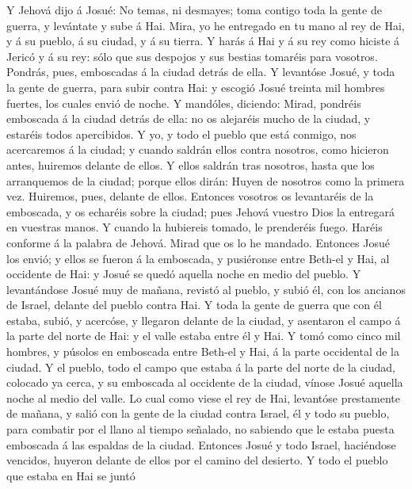  Y Jehová dijo á Josué: No temas, ni desmayes; toma
contigo toda la gente de guerra, y levántate y sube á Hai. Mira, yo he
entregado en tu mano al rey de Hai, y á su pueblo, á su ciudad, y á su
tierra.  Y harás á Hai y á su rey como hiciste á Jericó y
á su rey: sólo que sus despojos y sus bestias tomaréis para vosotros.
Pondrás, pues, emboscadas á la ciudad detrás de ella.  Y
levantóse Josué, y toda la gente de guerra, para subir contra Hai: y
escogió Josué treinta mil hombres fuertes, los cuales envió de noche.
 Y mandóles, diciendo: Mirad, pondréis emboscada á la
ciudad detrás de ella: no os alejaréis mucho de la ciudad, y estaréis
todos apercibidos.  Y yo, y todo el pueblo que está
conmigo, nos acercaremos á la ciudad; y cuando saldrán ellos contra
nosotros, como hicieron antes, huiremos delante de ellos. 
Y ellos saldrán tras nosotros, hasta que los arranquemos de la ciudad;
porque ellos dirán: Huyen de nosotros como la primera vez. Huiremos,
pues, delante de ellos.  Entonces vosotros os levantaréis
de la emboscada, y os echaréis sobre la ciudad; pues Jehová vuestro Dios
la entregará en vuestras manos.  Y cuando la hubiereis
tomado, le prenderéis fuego. Haréis conforme á la palabra de Jehová.
Mirad que os lo he mandado.  Entonces Josué los envió; y
ellos se fueron á la emboscada, y pusiéronse entre Beth-el y Hai, al
occidente de Hai: y Josué se quedó aquella noche en medio del pueblo.
 Y levantándose Josué muy de mañana, revistó al pueblo, y
subió él, con los ancianos de Israel, delante del pueblo contra Hai.
 Y toda la gente de guerra que con él estaba, subió, y
acercóse, y llegaron delante de la ciudad, y asentaron el campo á la
parte del norte de Hai: y el valle estaba entre él y Hai.
 Y tomó como cinco mil hombres, y púsolos en emboscada
entre Beth-el y Hai, á la parte occidental de la ciudad. 
Y el pueblo, todo el campo que estaba á la parte del norte de la ciudad,
colocado ya cerca, y su emboscada al occidente de la ciudad, vínose
Josué aquella noche al medio del valle.  Lo cual como
viese el rey de Hai, levantóse prestamente de mañana, y salió con la
gente de la ciudad contra Israel, él y todo su pueblo, para combatir por
el llano al tiempo señalado, no sabiendo que le estaba puesta emboscada
á las espaldas de la ciudad.  Entonces Josué y todo
Israel, haciéndose vencidos, huyeron delante de ellos por el camino del
desierto.  Y todo el pueblo que estaba en Hai se juntó

